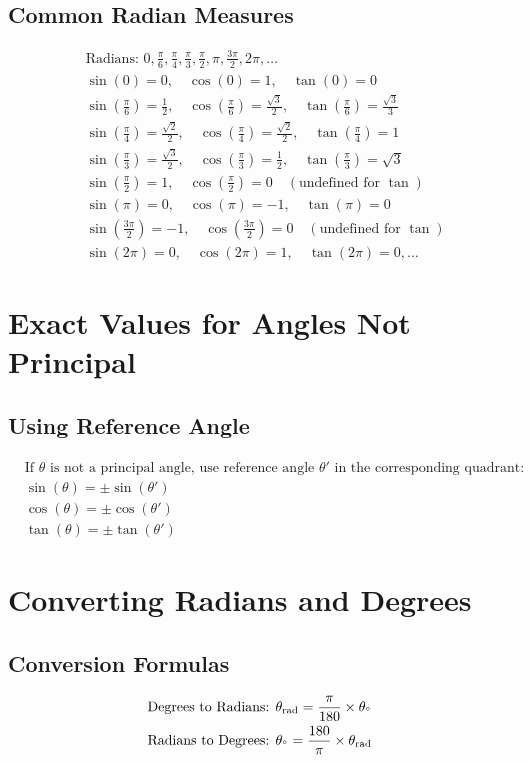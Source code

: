 \documentclass{article}
\begin{document}
\subsection{Common Radian Measures}
\[
\begin{aligned}
&\text{Radians: } 0, \frac{\pi}{6}, \frac{\pi}{4}, \frac{\pi}{3}, \frac{\pi}{2}, \pi, \frac{3\pi}{2}, 2\pi, \ldots \\
&\sin(0) = 0, \quad \cos(0) = 1, \quad \tan(0) = 0 \\
&\sin\left(\frac{\pi}{6}\right) = \frac{1}{2}, \quad \cos\left(\frac{\pi}{6}\right) = \frac{\sqrt{3}}{2}, \quad \tan\left(\frac{\pi}{6}\right) = \frac{\sqrt{3}}{3} \\
&\sin\left(\frac{\pi}{4}\right) = \frac{\sqrt{2}}{2}, \quad \cos\left(\frac{\pi}{4}\right) = \frac{\sqrt{2}}{2}, \quad \tan\left(\frac{\pi}{4}\right) = 1 \\
&\sin\left(\frac{\pi}{3}\right) = \frac{\sqrt{3}}{2}, \quad \cos\left(\frac{\pi}{3}\right) = \frac{1}{2}, \quad \tan\left(\frac{\pi}{3}\right) = \sqrt{3} \\
&\sin\left(\frac{\pi}{2}\right) = 1, \quad \cos\left(\frac{\pi}{2}\right) = 0 \quad (\text{undefined for }\tan) \\
&\sin(\pi) = 0, \quad \cos(\pi) = -1, \quad \tan(\pi) = 0 \\
&\sin\left(\frac{3\pi}{2}\right) = -1, \quad \cos\left(\frac{3\pi}{2}\right) = 0 \quad (\text{undefined for }\tan) \\
&\sin(2\pi) = 0, \quad \cos(2\pi) = 1, \quad \tan(2\pi) = 0, \ldots
\end{aligned}
\]

\section{Exact Values for Angles Not Principal}

\subsection{Using Reference Angle}
\[
\begin{aligned}
&\text{If }\theta \text{ is not a principal angle, use reference angle }\theta' \text{ in the corresponding quadrant:} \\
&\sin(\theta) = \pm\sin(\theta') \\
&\cos(\theta) = \pm\cos(\theta') \\
&\tan(\theta) = \pm\tan(\theta')
\end{aligned}
\]

\section{Converting Radians and Degrees}

\subsection{Conversion Formulas}
\[
\begin{aligned}
&\text{Degrees to Radians: } \theta_{\text{rad}} = \frac{\pi}{180} \times \theta_{\degree} \\
&\text{Radians to Degrees: } \theta_{\degree} = \frac{180}{\pi} \times \theta_{\text{rad}}
\end{aligned}
\]
\end{document}
